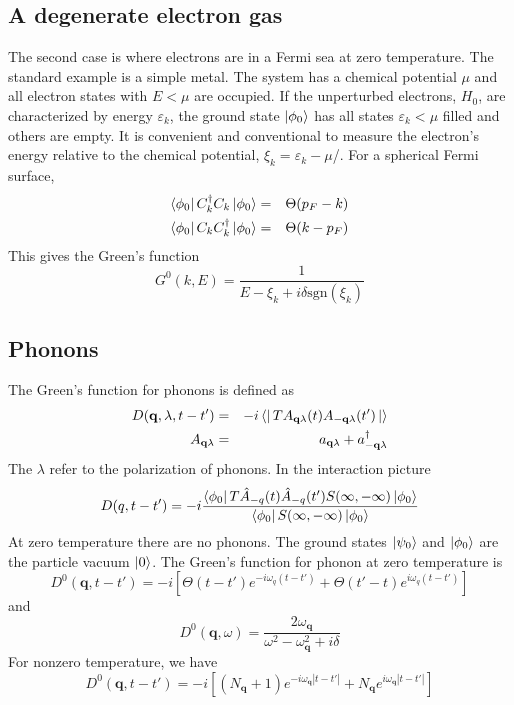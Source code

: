 \subsection{A degenerate electron gas}
The second case is where electrons are in a Fermi sea at zero temperature.
The standard example is a simple metal.
The system has a chemical potential $\mu$ and all electron states with $E<\mu$ are occupied.
If the unperturbed electrons, $H_0$, are characterized by energy $\varepsilon_k$, the ground state $\ket{\phi_0}$ has all states $\varepsilon_k<\mu$ filled and others are empty.
It is convenient and conventional to measure the electron's energy relative to the chemical potential, $\xi_k =\varepsilon_k -\mu$/.
For a spherical Fermi surface,
\begin{eqnarray}
  \bra{\phi_0}C^\dagger_k C_k \ket{\phi_0} &=& \Theta(p_F-k) \label{2.60}\\
  \bra{\phi_0}C_k C^\dagger_k \ket{\phi_0} &=& \Theta(k-p_F) \label{2.61}
\end{eqnarray}
This gives the Green's function
\begin{equation}
  G^0(k,E) = \frac{1}{E-\xi_k +i\delta \textrm{sgn}(\xi_k)} \label{2.65}
\end{equation}

\subsection{Phonons}
The Green's function for phonons is defined as
\begin{eqnarray}
  D(\mathbf{q},\lambda,t-t') &=& -i\bra{}T A_{\mathbf{q}\lambda}(t) A_{-\mathbf{q}\lambda}(t')\ket{} \label{2.66}\\
  A_{\mathbf{q}\lambda} &=& a_{\mathbf{q}\lambda} + a^\dagger_{\mathbf{-q}\lambda} \label{2.67}
\end{eqnarray}
The $\lambda$ refer to the polarization of phonons.
In the interaction picture
\begin{equation}
  D(q,t-t')=-i\frac{\bra{\phi_0}T \hat{A}_{-q}(t)\hat{A}_{-q}(t')S(\infty,-\infty)\ket{\phi_0}}{\bra{\phi_0}S(\infty,-\infty)\ket{\phi_0}} \label{2.68}
\end{equation}
At zero temperature there are no phonons.
The ground states $\ket{\psi_0}$ and $\ket{\phi_0}$ are the particle vacuum $\ket{0}$.
The Green's function for phonon at zero temperature is
\begin{equation}
  D^0(\mathbf{q},t-t') = -i\left[ \Theta(t-t')e^{-i\omega_q (t-t')} + \Theta(t'-t)e^{i\omega_q(t-t')} \right] \label{2.70}
\end{equation}
and
\begin{equation}
  \label{2.73}
  D^0 (\mathbf{q},\omega) = \frac{2\omega_\mathbf{q}}{\omega^2 - \omega_\mathbf{q}^2 + i\delta}
\end{equation}
For nonzero temperature, we have
\begin{equation}
  D^0(\mathbf{q},t-t') = -i\left[ (N_\mathbf{q}+1)e^{-i\omega_\mathbf{q}|t-t'|} + N_\mathbf{q} e^{i\omega_\mathbf{q}|t-t'|} \right]  \label{2.74}
\end{equation}

